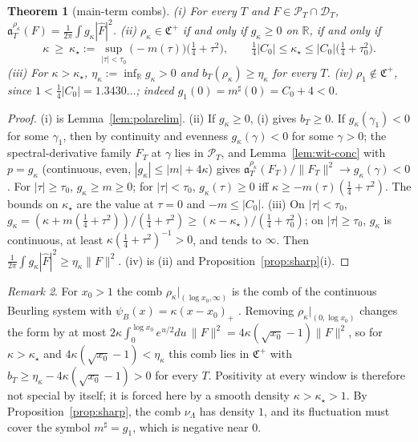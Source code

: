 \documentclass[11pt]{amsart}
\newtheorem{theorem}{Theorem}[section]
\theoremstyle{definition}
\theoremstyle{remark}
\newtheorem{remark}[theorem]{Remark}
\newcommand{\R}{\mathbb R}
\newcommand{\PT}{\mathcal P_T}
\newcommand{\Fh}{\widehat F}
\begin{document}
\begin{theorem}[main-term combs]\label{thm:kappa}
\emph{(i)} For every $T$ and $F\in\PT\cap\mathcal D_T$, $\mathfrak a^{\rho_\kappa}_T(F)=\frac1{2\pi}\int g_\kappa|\Fh|^2$.
\emph{(ii)} $\rho_\kappa\in\mathfrak C^+$ if and only if $g_\kappa\ge0$ on $\R$, if and only if
\[
\kappa\ \ge\ \kappa_\star:=\sup_{|\tau|<\tau_0}\big(-m(\tau)\big)\big(\tfrac14+\tau^2\big),\qquad
\tfrac14|C_0|\le\kappa_\star\le|C_0|\big(\tfrac14+\tau_0^2\big).
\]
\emph{(iii)} For $\kappa>\kappa_\star$, $\eta_\kappa:=\inf_\R g_\kappa>0$ and $b_T(\rho_\kappa)\ge\eta_\kappa$ for every $T$.
\emph{(iv)} $\rho_1\notin\mathfrak C^+$, since $1<\frac14|C_0|=1.3430\ldots$; indeed $g_1(0)=m^\sharp(0)=C_0+4<0$.
\end{theorem}

\begin{proof}
(i) is Lemma~\ref{lem:polarelim}. (ii) If $g_\kappa\ge0$, (i) gives $b_T\ge0$. If $g_\kappa(\gamma_1)<0$ for some $\gamma_1$, then by continuity and
evenness $g_\kappa(\gamma)<0$ for some $\gamma>0$; the spectral-derivative family $F_T$ at $\gamma$ lies in $\PT$, and
Lemma~\ref{lem:wit-conc} with $p=g_\kappa$ (continuous, even, $|g_\kappa|\le|m|+4\kappa$) gives
$\mathfrak a^{\rho_\kappa}_T(F_T)/\|F_T\|^2\to g_\kappa(\gamma)<0$. For $|\tau|\ge\tau_0$, $g_\kappa\ge m\ge0$; for $|\tau|<\tau_0$,
$g_\kappa(\tau)\ge0$ iff $\kappa\ge-m(\tau)(\frac14+\tau^2)$. The bounds on $\kappa_\star$ are the value at $\tau=0$ and
$-m\le|C_0|$. (iii) On $|\tau|<\tau_0$, $g_\kappa=(\kappa+m(\frac14+\tau^2))/(\frac14+\tau^2)\ge(\kappa-\kappa_\star)/(\frac14+\tau_0^2)$;
on $|\tau|\ge\tau_0$, $g_\kappa$ is continuous, at least $\kappa(\frac14+\tau^2)^{-1}>0$, and tends to $\infty$. Then
$\frac1{2\pi}\int g_\kappa|\Fh|^2\ge\eta_\kappa\|F\|^2$. (iv) is (ii) and Proposition~\ref{prop:sharp}(i).
\end{proof}

\begin{remark}\label{rem:beurling}
For $x_0>1$ the comb $\rho_\kappa|_{(\log x_0,\infty)}$ is the comb of the continuous Beurling system with
$\psi_B(x)=\kappa(x-x_0)_+$ \cite{DiamondZhang2016}. Removing $\rho_\kappa|_{(0,\log x_0)}$ changes the form by at most
$2\kappa\int_0^{\log x_0}e^{u/2}du\,\|F\|^2=4\kappa(\sqrt{x_0}-1)\|F\|^2$, so for $\kappa>\kappa_\star$ and $4\kappa(\sqrt{x_0}-1)<\eta_\kappa$
this comb lies in $\mathfrak C^+$ with $b_T\ge\eta_\kappa-4\kappa(\sqrt{x_0}-1)>0$ for every $T$. Positivity at every window is
therefore not special by itself; it is forced here by a smooth density $\kappa>\kappa_\star>1$. By
Proposition~\ref{prop:sharp}, the comb $\nu_\Lambda$ has density $1$, and its fluctuation must cover the symbol
$m^\sharp=g_1$, which is negative near $0$.
\end{remark}
\end{document}
